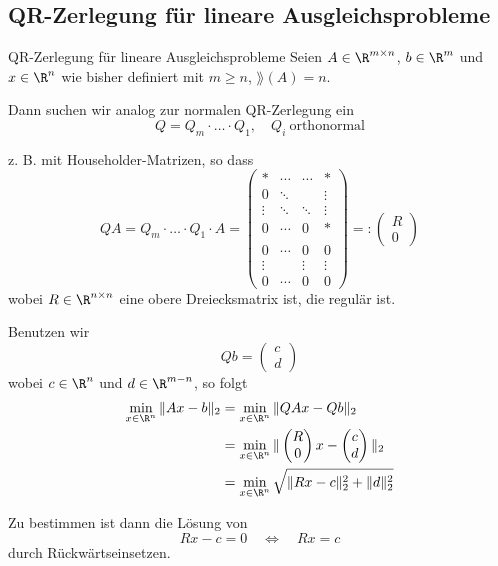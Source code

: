 \subsection{QR-Zerlegung für lineare Ausgleichsprobleme}

\begin{defi}{QR-Zerlegung für lineare Ausgleichsprobleme}
    Seien $A \in \R^{m \times n}$, $b \in \R^{m}$ und $x \in \R^{n}$ wie bisher definiert mit $m \geq n$, $\rang(A) = n$.

    Dann suchen wir analog zur normalen QR-Zerlegung ein
    \[
        Q = Q_m \cdot \ldots \cdot Q_1, \quad Q_i \ \text{orthonormal}
    \]

    z. B. mit Householder-Matrizen, so dass
    \[
        QA = Q_m \cdot \ldots \cdot Q_1 \cdot A =
        \begin{pmatrix}
            *      & \cdots & \cdots & *      \\
            0      & \ddots &        & \vdots \\
            \vdots & \ddots & \ddots & \vdots \\
            0      & \cdots & 0      & *      \\
                   &        &        &        \\
            0      & \cdots & 0      & 0      \\
            \vdots &        & \vdots & \vdots \\
            0      & \cdots & 0      & 0
        \end{pmatrix}
        =:
        \begin{pmatrix}
            R \\
            0
        \end{pmatrix}
    \]
    wobei $R \in \R^{n \times n}$ eine obere Dreiecksmatrix ist, die regulär ist.

    Benutzen wir
    \[
        Qb = \begin{pmatrix}
            c \\
            d
        \end{pmatrix}
    \]
    wobei $c \in \R^n$ und $d \in \R^{m - n}$, so folgt
    \begin{alignat*}{1}
        \min_{x \in \R^n} \|Ax - b\|_2 & = \min_{x \in \R^n} \|QAx - Qb\|_2                                                    \\
                                       & = \min_{x \in \R^n} \| \begin{pmatrix} R \\ 0 \end{pmatrix} x - \begin{pmatrix} c \\ d \end{pmatrix} \|_2 \\
                                       & = \min_{x \in \R^n} \sqrt{\| Rx - c \|^2_2 + \| d \|^2_2}
    \end{alignat*}

    Zu bestimmen ist dann die Lösung von
    \[
        Rx - c = 0 \quad \iff \quad Rx = c
    \]
    durch Rückwärtseinsetzen.
\end{defi}

